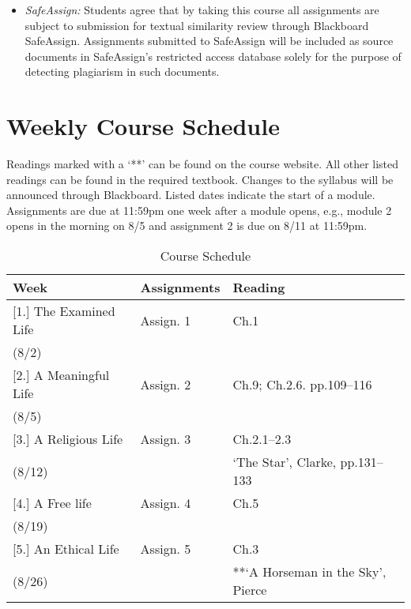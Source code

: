 \documentclass[article,oneside]{memoir}
\begin{document}
\begin{itemize}
\item \textit{SafeAssign:} Students agree that by taking this course all assignments are subject to submission for textual similarity review through Blackboard SafeAssign. Assignments submitted to SafeAssign will be included as source documents in SafeAssign's restricted access database solely for the purpose of detecting plagiarism in such documents.  


\end{itemize}



\newpage
\section{Weekly Course Schedule}
Readings marked with a `**' can be found on the course website. All other listed readings can be found in the required textbook. Changes to the syllabus will be announced through Blackboard. Listed dates indicate the start of a module.  Assignments are due at 11:59pm one week after a module opens, e.g., module 2 opens in the morning on 8/5 and assignment 2 is due on 8/11 at 11:59pm.  \newline


\begin{center}
\begin{longtable}{p{3.5cm}p{2cm}p{7cm}}
 
  \caption{Course Schedule} \\
  \toprule
  \textbf{Week} &\textbf{Assignments} & \textbf{Reading} \\
  \midrule

  


[1.] The Examined Life		&  Assign. 1		&  Ch.1 \\
(8/2)					& 				&  \\[10pt]   

[2.] A Meaningful Life			&  Assign. 2		&  Ch.9; Ch.2.6. pp.109--116\\
(8/5)						& 					& \\[10pt] 
						
[3.] A Religious Life		 	&  Assign. 3		& Ch.2.1--2.3\\ 
(8/12)						& 					&  `The Star', Clarke, pp.131--133 \\[10pt] 
															
							
[4.] A Free life				& Assign. 4		& Ch.5\\
(8/19)					&				&   \\[10pt] 
						


[5.] An Ethical Life			& Assign. 5		& Ch.3 \\
(8/26)					&				&  **`A Horseman in the Sky', Pierce \\ [10pt] 
						\end{longtable}
\end{center}



\end{document}
